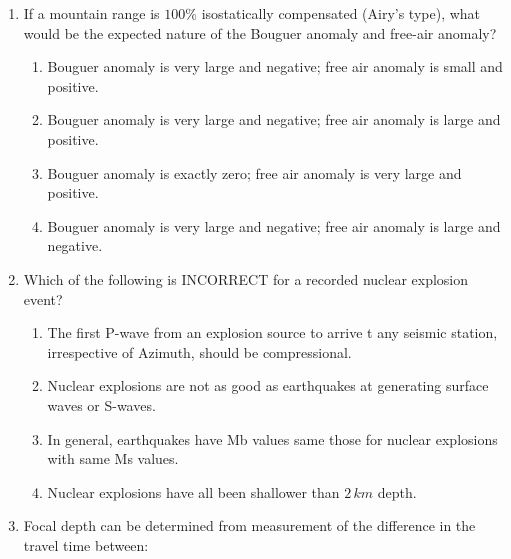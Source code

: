 \documentclass[journal,12pt,onecolumn]{IEEEtran}
\theoremstyle{remark}
\begin{document}
\begin{enumerate}
    \item If a mountain range is $100\%$ isostatically compensated (Airy's type), what would be the expected nature of the Bouguer anomaly and free-air anomaly?\hfill{}
        \begin{enumerate}
                \item Bouguer anomaly is very large and negative; free air anomaly is small and positive.
                \item Bouguer anomaly is very large and negative; free air anomaly is large and positive.
                \item Bouguer anomaly is exactly zero; free air anomaly is very large and positive.
                \item Bouguer anomaly is very large and negative; free air anomaly is large and negative.
        \end{enumerate}
    
    \item Which of the following is INCORRECT for a recorded nuclear explosion event? \hfill{}
        \begin{enumerate}
            \item The first P-wave from an explosion source to arrive t any seismic station, irrespective of Azimuth, should be compressional.
            \item Nuclear explosions are not as good as earthquakes at generating surface waves or S-waves.
            \item In general, earthquakes have Mb values same those for nuclear explosions with same Ms values.
            \item Nuclear explosions have all been shallower than $2\,km$ depth.
        \end{enumerate}
    
    \item Focal depth can be determined from measurement of the difference in the travel time between: \hfill{}
                \begin{enumerate}
                \end{enumerate}
    

\end{enumerate}
\end{document}
